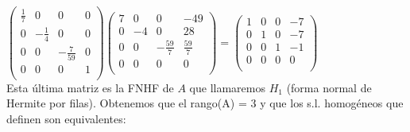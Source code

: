 \documentclass[11pt, a4paper]{article}
\newif\IfInSansMode
\theoremstyle{theorem-style}
\theoremstyle{definition-style}
\theoremstyle{remark-style}
\theoremstyle{example-style}
\begin{document}
$\begin{pmatrix}
\frac{1}{7} & 0 & 0 & 0\\
0 & -\frac{1}{4} & 0 & 0\\
0 & 0 & -\frac{7}{59} & 0\\
0 & 0 & 0 & 1 \\
\end{pmatrix}    
\begin{pmatrix}
7 & 0 & 0 & -49 \\
0 & -4 & 0 & 28 \\
0 & 0 & -\frac{59}{7} & \frac{59}{7} \\
0 & 0 & 0 & 0 \\
\end{pmatrix} = 
\begin{pmatrix}
1 & 0 & 0 & -7 \\
0 & 1 & 0 & -7 \\
0 & 0 & 1 & -1 \\
0 & 0 & 0 & 0 \\
\end{pmatrix}$ \\

Esta última matriz es la FNHF de $A$ que llamaremos $H_1$ (forma normal de Hermite por filas). Obtenemos que el rango(A) = 3 y que los s.l. homogéneos que definen son equivalentes:
\end{document}
